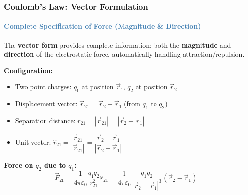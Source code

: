 \begin{frame}
\frametitle{\textsf{\textbf{Coulomb's Law:} Vector Formulation}}
\framesubtitle{\textcolor{steelblue}{Complete Specification of Force (Magnitude \& Direction)}}

\vspace{-0.05cm}

\begin{keybox}
\vspace{0.05cm}
The \textbf{vector form} provides complete information: both the \textbf{magnitude} and \textbf{direction} of the electrostatic force, automatically handling attraction/repulsion.
\vspace{0.05cm}
\end{keybox}

\vspace{0.25cm}

\begin{examplebox}
\vspace{0.1cm}
\textbf{Configuration:}
\begin{itemize}
    \item Two point charges: $q_1$ at position $\vec{r}_1$, \quad $q_2$ at position $\vec{r}_2$
    \item Displacement vector: $\vec{r}_{21} = \vec{r}_2 - \vec{r}_1$ \quad (from $q_1$ to $q_2$)
    \item Separation distance: $r_{21} = |\vec{r}_{21}| = |\vec{r}_2 - \vec{r}_1|$
    \item Unit vector: $\hat{r}_{21} = \dfrac{\vec{r}_{21}}{|\vec{r}_{21}|} = \dfrac{\vec{r}_2 - \vec{r}_1}{|\vec{r}_2 - \vec{r}_1|}$
\end{itemize}
\end{examplebox}

\vspace{0.3cm}

\begin{formulabox}
\vspace{0.15cm}
\textbf{Force on $q_2$ due to $q_1$:}
\begin{equation*}
\boxed{\vec{F}_{21} = \frac{1}{4\pi\varepsilon_0} \frac{q_1 q_2}{r_{21}^2} \hat{r}_{21} = \frac{1}{4\pi\varepsilon_0} \frac{q_1 q_2}{|\vec{r}_2 - \vec{r}_1|^3} (\vec{r}_2 - \vec{r}_1)}
\end{equation*}
\vspace{0.1cm}


\end{formulabox}
\end{frame}
